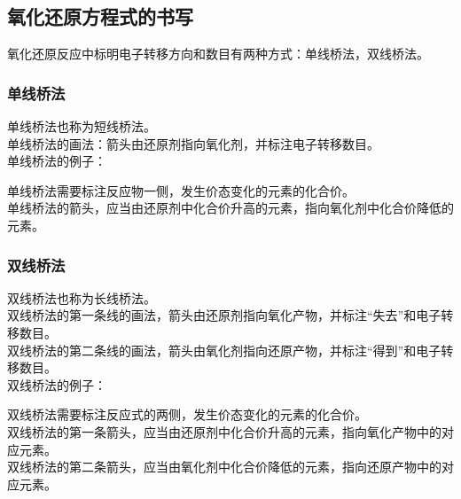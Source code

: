 \documentclass[UTF8]{ctexart}
\newcommand{\LiValence}[3]
{
    \overset{\texttt{\tiny #1}\text{\tiny #2}}{\ce{#3}}
}
\newcommand{\LiDrawContainer}[6][solid]
{
    \coordinate (A1) at #2;
    \coordinate (A2) at #3;
    \coordinate (B1) at ($#2+(0,#4)$);
    \coordinate (B2) at ($#3+(0,#4)$);

    \draw (A1)--(B1);
    \draw[#1] (B2)--(A2);
    \draw (B1)--(B2);

    \node at($0.5*(B1)+0.5*(B2)+(0,#5)$) {#6};
}
\begin{document}
\newpage

\subsection{氧化还原方程式的书写}
    氧化还原反应中标明电子转移方向和数目有两种方式：单线桥法，双线桥法。

\subsubsection{单线桥法}
    单线桥法也称为短线桥法。\\[3mm]
    单线桥法的画法：箭头由还原剂指向氧化剂，并标注电子转移数目。\\[3mm]
    单线桥法的例子：
    \begin{center}
    \end{center}
    单线桥法需要标注反应物一侧，发生价态变化的元素的化合价。\\[3mm]
    单线桥法的箭头，应当由还原剂中化合价升高的元素，指向氧化剂中化合价降低的元素。

\subsubsection{双线桥法}
    双线桥法也称为长线桥法。\\[3mm]
    双线桥法的第一条线的画法，箭头由还原剂指向氧化产物，并标注“失去”和电子转移数目。\\[3mm]
    双线桥法的第二条线的画法，箭头由氧化剂指向还原产物，并标注“得到”和电子转移数目。\\[3mm]
    双线桥法的例子：
    \begin{center}
    \end{center}
    双线桥法需要标注反应式的两侧，发生价态变化的元素的化合价。\\[3mm]
    双线桥法的第一条箭头，应当由还原剂中化合价升高的元素，指向氧化产物中的对应元素。\\[3mm]
    双线桥法的第二条箭头，应当由氧化剂中化合价降低的元素，指向还原产物中的对应元素。
\end{document}

